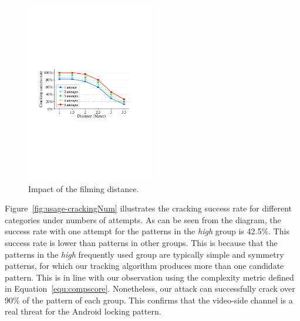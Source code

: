         \begin{figure}[t!]
            \centering
            \includegraphics[width=0.5\textwidth]{fig/12.pdf}
            \caption{Impact of the filming distance.}
            \label{fig:fig12}
        \end{figure}


            Figure~\ref{fig:usage-crackingNum} illustrates the cracking success rate for different categories under
            numbers of attempts.  As can be seen from the diagram, the success rate with one attempt for the patterns
            in the \emph{high} group is 42.5\%. This success rate is lower than patterns in other groups. This is because that
            the patterns in the \emph{high} frequently used group are typically simple and symmetry patterns, for which our tracking algorithm produces more
            than one candidate pattern. This is in line with our observation using the complexity metric defined in
            Equation~\ref{equ:compscore}. Nonetheless, our attack can successfully crack over 90\% of the pattern of
            each group. This confirms that the video-side channel is a real threat for the Android locking pattern.

